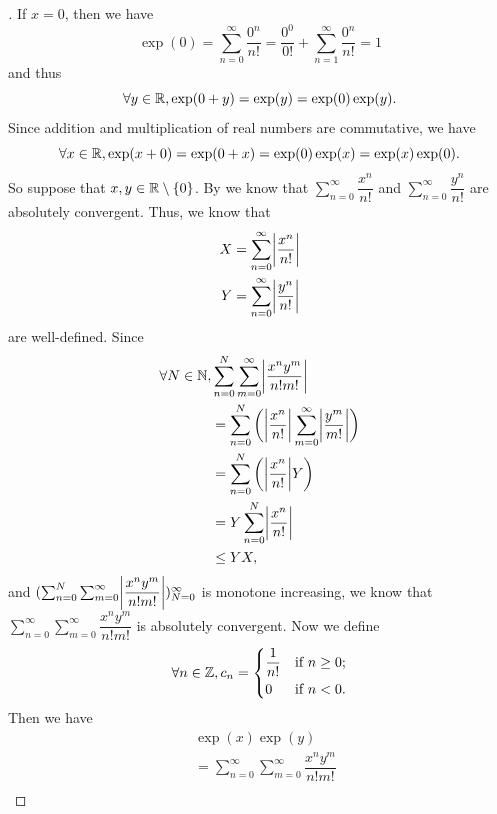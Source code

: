 \begin{proof}[]
  If \(x = 0\), then we have
  \[
    \exp(0) = \sum_{n = 0}^\infty \dfrac{0^n}{n!} = \dfrac{0^0}{0!} + \sum_{n = 1}^\infty \dfrac{0^n}{n!} = 1
  \]
  and thus
  \[
    \forall y \in \mathbb{R}, \exp(0 + y) = \exp(y) = \exp(0) \exp(y).
  \]
  Since addition and multiplication of real numbers are commutative, we have
  \[
    \forall x \in \mathbb{R}, \exp(x + 0) = \exp(0 + x) = \exp(0) \exp(x) = \exp(x) \exp(0).
  \]
  So suppose that \(x, y \in \mathbb{R} \setminus \left\lbrace0\right\rbrace\).
  By  we know that \(\sum_{n = 0}^\infty \dfrac{x^n}{n!}\) and \(\sum_{n = 0}^\infty \dfrac{y^n}{n!}\) are absolutely convergent.
  Thus, we know that
  \begin{align*}
    X & = \sum_{n = 0}^\infty \abs{\dfrac{x^n}{n!}} \\
    Y & = \sum_{n = 0}^\infty \abs{\dfrac{y^n}{n!}}
  \end{align*}
  are well-defined.
  Since
  \begin{align*}
    \forall N \in \N, & \sum_{n = 0}^N \sum_{m = 0}^\infty \abs{\dfrac{x^n y^m}{n! m!}}                              \\
                      & = \sum_{n = 0}^N \bigg(\abs{\dfrac{x^n}{n!}} \sum_{m = 0}^\infty \abs{\dfrac{y^m}{m!}}\bigg) \\
                      & = \sum_{n = 0}^N \bigg(\abs{\dfrac{x^n}{n!}} Y\bigg)                                         \\
                      & = Y \sum_{n = 0}^N \abs{\dfrac{x^n}{n!}}                                                     \\
                      & \leq Y X,
  \end{align*}
  and \((\sum_{n = 0}^N \sum_{m = 0}^\infty \abs{\dfrac{x^n y^m}{n! m!}})_{N = 0}^\infty\) is monotone increasing, we know that \(\sum_{n = 0}^\infty \sum_{m = 0}^\infty \dfrac{x^n y^m}{n! m!}\) is absolutely convergent.
  Now we define
  \[
    \forall n \in \mathbb{Z}, c_n = \begin{dcases}
      \dfrac{1}{n!} & \text{if } n \geq 0; \\
      0             & \text{if } n < 0.
    \end{dcases}
  \]
  Then we have
  \begin{align*}
     & \exp(x) \exp(y)                                                                                                                                                           \\
     & = \sum_{n = 0}^\infty \sum_{m = 0}^\infty \dfrac{x^n y^m}{n! m!}                                                                                                          \\

\end{align*}
\end{proof}
